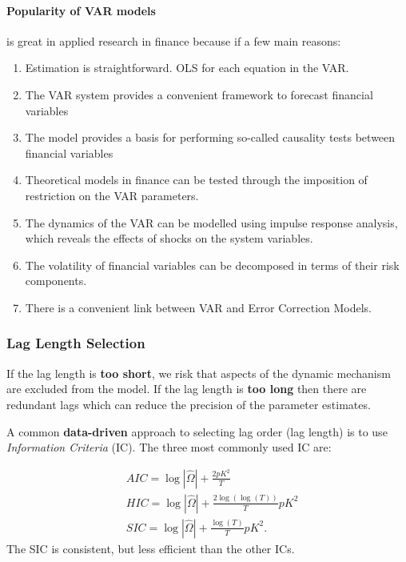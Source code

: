 \documentclass[11pt]{article}
\begin{document}
\paragraph{Popularity of VAR models} is great in applied research in finance because if a few main reasons:
\begin{enumerate}
    \item Estimation is straightforward. OLS for each equation in the VAR.
    \item The VAR system provides a convenient framework to forecast financial variables
    \item The model provides a basis for performing so-called causality tests between financial variables
    \item Theoretical models in finance can be tested through the imposition of restriction on the VAR parameters.
    \item The dynamics of the VAR can be modelled using impulse response analysis, which reveals the effects of shocks on the system variables.
    \item The volatility of financial variables can be decomposed in terms of their risk components.
    \item There is a convenient link between VAR and Error Correction Models.
\end{enumerate}

\subsubsection{Lag Length Selection}

If the lag length is \textbf{too short}, we risk that aspects of the dynamic mechanism are excluded from the model. If the lag length is \textbf{too long} then there are redundant lags which can reduce the precision of the parameter estimates.

A common \textbf{data-driven} approach to selecting lag order (lag length) is to use \textit{Information Criteria} (IC). The three most commonly used IC are:

\begin{equation}
\begin{aligned}
& A I C=\log |\widehat{\Omega}|+\frac{2 p K^2}{T} \\
& H I C=\log |\widehat{\Omega}|+\frac{2 \log (\log (T))}{T} p K^2 \\
& S I C=\log |\widehat{\Omega}|+\frac{\log (T)}{T} p K^2 .
\end{aligned}
\end{equation}
The SIC is consistent, but less efficient than the other ICs.
\end{document}
